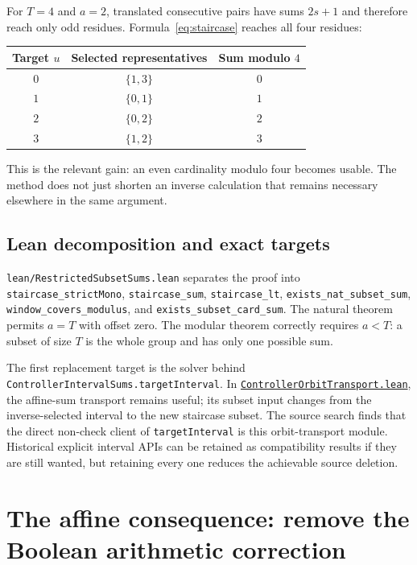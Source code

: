 \documentclass[11pt,letterpaper]{article}
\newcommand{\repobase}{https://github.com/VladimirReshetnikov/ProveIt/blob/9f35798db4a63c25e435fca14d75931144657d7e}
\newcommand{\leanfile}[1]{\href{\repobase/Computability/DiophantineConsistency/Lean/DiophantineConsistency/#1.lean}{\nolinkurl{#1.lean}}}
\newcommand{\ident}[1]{\nolinkurl{#1}}
\newcommand{\artifact}[1]{\nolinkurl{#1}}
\begin{document}
For $T=4$ and $a=2$, translated consecutive pairs have sums $2s+1$ and
therefore reach only odd residues. Formula~\eqref{eq:staircase} reaches all
four residues:

\begin{center}
\begin{tabular}{@{}ccc@{}}
\toprule
Target $u$ & Selected representatives & Sum modulo $4$ \\
\midrule
$0$ & $\{1,3\}$ & $0$ \\
$1$ & $\{0,1\}$ & $1$ \\
$2$ & $\{0,2\}$ & $2$ \\
$3$ & $\{1,2\}$ & $3$ \\
\bottomrule
\end{tabular}
\end{center}

This is the relevant gain: an even cardinality modulo four becomes usable.
The method does not just shorten an inverse calculation that remains
necessary elsewhere in the same argument.

\subsection{Lean decomposition and exact targets}

\artifact{lean/RestrictedSubsetSums.lean} separates the proof into
\ident{staircase_strictMono}, \ident{staircase_sum},
\ident{staircase_lt}, \ident{exists_nat_subset_sum},
\ident{window_covers_modulus}, and \ident{exists_subset_card_sum}.
The natural theorem permits $a=T$ with offset zero. The modular theorem
correctly requires $a<T$: a subset of size $T$ is the whole group and has
only one possible sum.

The first replacement target is the solver behind
\ident{ControllerIntervalSums.targetInterval}. In
\leanfile{ControllerOrbitTransport}, the affine-sum transport remains useful;
its subset input changes from the inverse-selected interval to the new
staircase subset. The source search finds that the direct non-check client of
\ident{targetInterval} is this orbit-transport module. Historical explicit
interval APIs can be retained as compatibility results if they are still
wanted, but retaining every one reduces the achievable source deletion.

\section{The affine consequence: remove the Boolean arithmetic correction}
\label{sec:affine}
\end{document}

